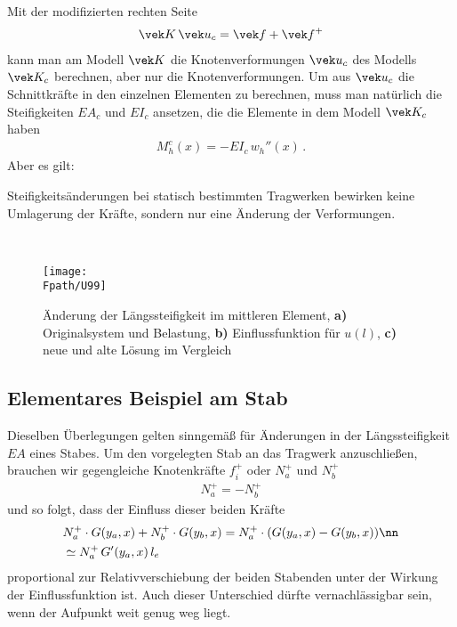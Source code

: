 {{{{Mit der modifizierten rechten Seite
\begin{align}
\vek K\,\vek u_c = \vek f + \vek f^+
\end{align}
kann man am Modell $\vek K$ die Knotenverformungen $\vek u_c$ des Modells $\vek K_c$ berechnen, aber nur die Knotenverformungen. Um aus $\vek u_c$ die Schnittkr\"{a}fte in den einzelnen Elementen zu berechnen, muss man nat\"{u}rlich die Steifigkeiten $EA_c$ und $EI_c$ ansetzen, die die Elemente in dem Modell $\vek K_c$ haben
\begin{align}
M_h^c(x) = - EI_c\,w_h''(x)\,.
\end{align}
Aber es gilt:

\hspace*{-12pt}\colorbox{hellgrau}{\parbox{0.98\textwidth}{Steifigkeits\"{a}nderungen bei statisch bestimmten Tragwerken bewirken keine Umlagerung der Kr\"{a}fte, sondern nur eine \"{A}nderung der Verformungen.}}\\

\begin{figure}[tbp]
\centering
\texttt{[image: \\Fpath/U99]}
\caption{\"{A}nderung der L\"{a}ngssteifigkeit im mittleren Element,  \textbf{ a)} Originalsystem und Belastung,  \textbf{ b)} Einflussfunktion f\"{u}r $u(l)$,  \textbf{ c)} neue und alte L\"{o}sung im Vergleich}
\label{U99}
%
\end{figure}%



\textcolor{blau2}{\section{Elementares Beispiel am Stab}}
Dieselben \"{U}berlegungen gelten sinngem\"{a}{\ss} f\"{u}r \"{A}nderungen in der L\"{a}ngssteifigkeit $EA $ eines Stabes. Um den vorgelegten Stab an das Tragwerk anzuschlie{\ss}en, brauchen wir gegengleiche Knotenkr\"{a}fte $f_i^+$ oder $N_a^+$ und $N_b^+$
\begin{align}
N_a^+ = - N_b^+
\end{align}
und so folgt, dass der Einfluss dieser beiden Kr\"{a}fte
\begin{align}
&N_a^+ \cdot G(y_a,x) + N_b^+ \cdot G(y_b,x) = N_a^+ \cdot (G(y_a,x) - G(y_b,x)) \nn\\
&\simeq N_a^+ \,G'(y_a,x)\,l_e
\end{align}
proportional zur Relativverschiebung der beiden Stabenden unter der Wirkung der Einflussfunktion ist. Auch dieser Unterschied d\"{u}rfte vernachl\"{a}ssigbar sein, wenn der Aufpunkt weit genug weg liegt.\\

}}}}

